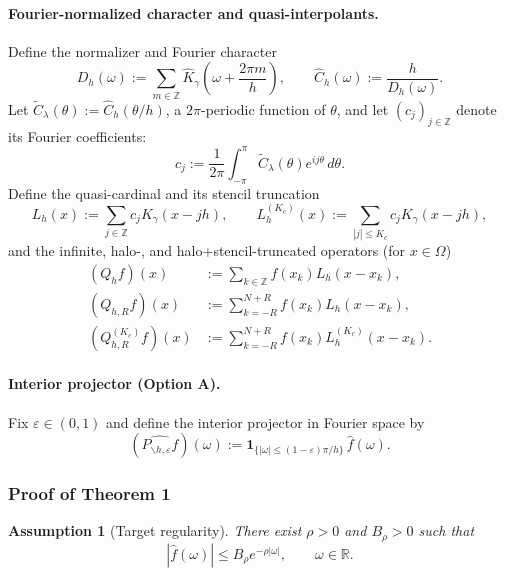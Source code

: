 \documentclass[11pt]{article}
\newtheorem{assumption}{Assumption}
\newcommand{\R}{\mathbb{R}}
\newcommand{\Z}{\mathbb{Z}}
\newcommand{\wh}[1]{\widehat{#1}}
\begin{document}
\paragraph{Fourier-normalized character and quasi-interpolants.}
Define the normalizer and Fourier character
\begin{equation}
D_h(\omega):=\sum_{m\in\Z}\wh K_\gamma\!\left(\omega+\frac{2\pi m}{h}\right),
\qquad
\wh C_h(\omega):=\frac{h}{D_h(\omega)}.
\label{eq:normalizer}
\end{equation}
Let $\widetilde C_\lambda(\theta):=\wh C_h(\theta/h)$, a $2\pi$-periodic function of $\theta$, and let $(c_j)_{j\in\Z}$ denote its Fourier coefficients:
\begin{equation}
c_j:=\frac{1}{2\pi}\int_{-\pi}^{\pi} \widetilde C_\lambda(\theta)e^{ij\theta}\,d\theta.
\label{eq:fourier-coeffs}
\end{equation}
Define the quasi-cardinal and its stencil truncation
\begin{equation}
L_h(x):=\sum_{j\in\Z} c_j K_\gamma(x-jh),
\qquad
L_h^{(K_c)}(x):=\sum_{|j|\le K_c} c_j K_\gamma(x-jh),
\label{eq:quasi-cardinal}
\end{equation}
and the infinite, halo-, and halo+stencil-truncated operators (for $x\in\Omega$)
\begin{align}
(Q_hf)(x) &:= \sum_{k\in\Z} f(x_k)L_h(x-x_k), \label{eq:appendix-qh}\\
(Q_{h,R}f)(x) &:= \sum_{k=-R}^{N+R} f(x_k)L_h(x-x_k), \label{eq:appendix-qhr}\\
(Q_{h,R}^{(K_c)}f)(x) &:= \sum_{k=-R}^{N+R} f(x_k)L_h^{(K_c)}(x-x_k). \label{eq:appendix-qhrkc}
\end{align}

\paragraph{Interior projector (Option A).}
Fix $\varepsilon\in(0,1)$ and define the interior projector in Fourier space by
\begin{equation}
(\widehat{P_{\backslash h,\varepsilon}f})(\omega):=\mathbf 1_{\{|\omega|\le (1-\varepsilon)\pi/h\}}\,\wh f(\omega).
\label{eq:interior-projector}
\end{equation}

\subsubsection{Proof of Theorem 1}
\begin{assumption}[Target regularity]
There exist $\rho>0$ and $B_\rho>0$ such that
\begin{equation}
|\wh f(\omega)|\le B_\rho e^{-\rho|\omega|},
\qquad \omega\in\R.
\label{eq:assump-target}
\end{equation}
\end{assumption}
\end{document}
